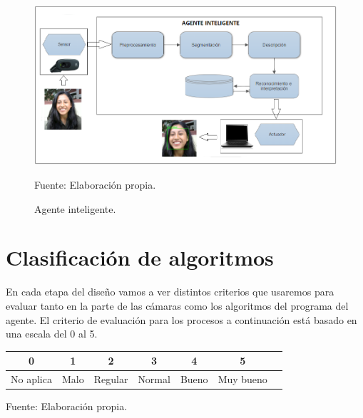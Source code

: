 \begin{figure}[ht]
\begin{center}
\includegraphics[width=1\textwidth]{Imagen26}
\end{center}
\begin{center}
\vskip -0.5cm
\caption{\small{Agente inteligente.}}
{\small{Fuente: Elaboración propia.}}
\end{center}
\end{figure}

\vskip 3cm

\section{Clasificación de algoritmos}
En cada etapa del diseño vamos a ver distintos criterios que usaremos para evaluar tanto en la parte de las cámaras como los algoritmos del programa del agente. El criterio de evaluación para los procesos a continuación está basado en una escala del 0
al 5.

\begin{table}[ht!]
\centering
\begin{tabular}{|c|c|c|c|c|c|c|} \hline
\bf 0 & \bf 1 & \bf 2 & \bf 3 & \bf 4 & \bf 5 \\ \hline
No aplica & Malo & Regular & Normal & Bueno & Muy bueno \\ \hline 
\end{tabular}
{\small{Fuente: Elaboración propia.}}
\end{table}

\vskip 3cm

